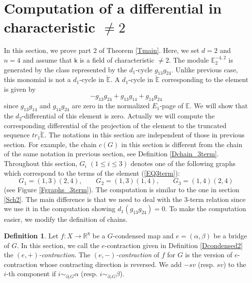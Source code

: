 \documentclass[reqno]{amsart}
\theoremstyle{definition}
\newtheorem{defi}{Definition}[section]
\theoremstyle{plain}
\newcommand{\CEE}{\check{\mathbb{E}}}
\newcommand{\RR}{\mathbb{R}}
\newcommand{\EE}{\mathbb{E}}
\newcommand{\kk}{\mathsf{k}}
\begin{document}
\section{Computation of a differential in characteristic $\not=2$}\label{Snon-triviality}
In this section, we prove part 2 of Theorem \ref{Tmain}.  Here, we set $d=2$ and $n=4$ and assume that $\kk$ is a field of characteristic $\not=2$. The module $\EE^{-4,2}_2$ is generated by the class represented by the $d_1$-cycle $g_{13}g_{24}$. Unlike previous case, this monomial is not a $d_1$-cycle in $\CEE$. A $d_1$-cycle in $\CEE$ corresponding to the element  is given by
\begin{equation}
-g_{13}g_{24}+g_{13}g_{14}+g_{14}g_{24}\label{EQ3term}
\end{equation}
since $g_{13}g_{14}$ and $g_{14}g_{24}$ are zero in the normalized $E_1$-page of $\EE$.  We will show that the $d_2$-differential of this element is zero. Actually we will compute the corresponding differential of the projection of the element  to the truncated  sequence $tr_1\CEE$.  The notations in this section are independent of those in previous section. For example, the chain $c(G)$ in this section is different from the chain of the same notation in previous section, see Definition \ref{Dchain_3term}. \\
\indent Throughout this section, $G_i$ $(1\leq i\leq 3)$ denotes one of the following graphs which correspond to the terms of the element (\ref{EQ3term}):
\[
G_1=(1,3)(2,4),\qquad G_2=(1,3)(1,4),\qquad G_3=(1,4)(2,4)
\]
(see Figure \ref{Fgraphs_3term}). The computation is similar to the one in section \ref{Sch2}. The main difference is that we need to deal with the 3-term relation since we use it in the computation showing $d_1(g_{13}g_{24})=0$. To make the computation easier, we modify the definition of chains.


 



\begin{defi}\label{D(e,-)-cont}
Let $f:X\to \RR^8$ be a $G$-condensed map and $e=(\alpha,\beta)$ be a bridge of $G$.
In this section, we call the $e$-contraction given in Definition \ref{Dcondensed2} the {\em $(e,+)$-contraction}. The {\em $(e,-)$-contraction} of $f$ for $G$ is the version of $e$-contraction whose contracting direction is reversed. We add $-sv$ (resp. $sv$) to the $i$-th component if $i\sim_{\partial_eG} \alpha$ (resp. $i\sim_{\partial_eG}\beta$).  
\end{defi} 
\end{document}
